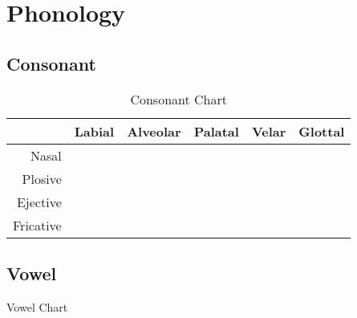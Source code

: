 \chapter{Phonology}

\section{Consonant}

\begin{table}[H]
    \centering
    \begin{tabu}{r | c c c c c}
                    &   Labial                  &   Alveolar 
                    &   Palatal                 &   Velar
                    &   Glottal                 \\\hline
                    
        Nasal       &          &    
                    &   \broad{\xJ} \orth{\nU}  &   \broad{\xN} 
                    &                           \\
                    
        Plosive     &          &    
                    &    \orth{\dU}    &    
                    &   \broad{\gs}     \\
                    
        Ejective    &   \broad{\pE}     &   \broad{\tE} 
                    &   \broad{\cE} \orth{\tU}  &   \broad{\kE} 
                    &                           \\
        
        Fricative   &          &     
                    &   \broad{\xC} \orth{\sU}  &    
                    &          \\
        
    \end{tabu}
    \caption{Consonant Chart}
    \label{tab:consc}
\end{table}


\section{Vowel}

\begin{table}[H]
    \centering
    \begin{vowel}[plain]
    \end{vowel}
    \caption{Vowel Chart}
    \label{tab:vowelc}
\end{table}


